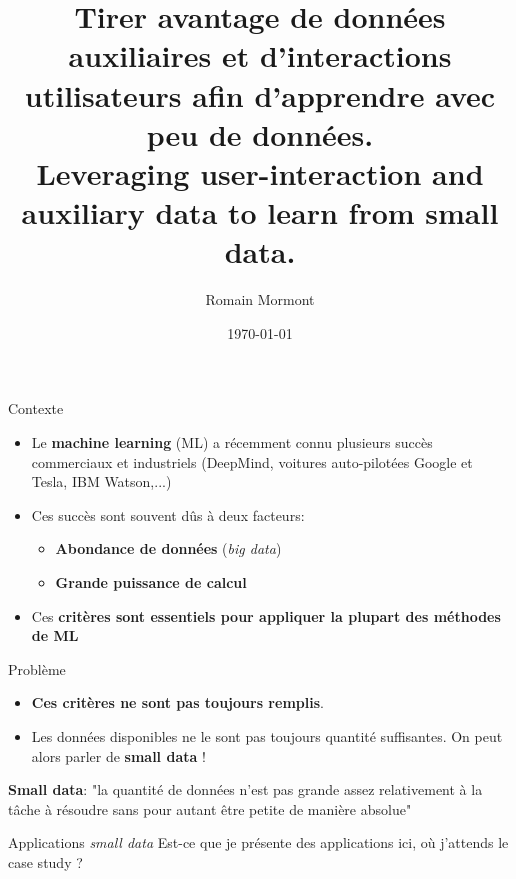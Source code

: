 \documentclass{beamer}
\title{
{\bf Tirer avantage de données auxiliaires et d'interactions utilisateurs afin d'apprendre avec peu de données.} \\
{\footnotesize \bf Leveraging user-interaction and auxiliary data to learn from small data.}
}
\author{Romain Mormont}
\institute{Unité systèmes et modélisation, \\ Département d'électricité, électronique et informatique, \\ Université de Liège, Belgique}
\date{\today}
\begin{document}


\begin{frame}
\titlepage
\end{frame}

\begin{frame}{Contexte}
	\begin{itemize}
		\item Le \textbf{machine learning} (ML) a récemment connu plusieurs succès commerciaux et industriels (DeepMind, voitures auto-pilotées Google et Tesla, IBM Watson,...)
		\item Ces succès sont souvent dûs à deux facteurs: 
		\begin{itemize}
			\item \textbf{Abondance de données} (\textit{big data})
			\item \textbf{Grande puissance de calcul}
		\end{itemize}
		\item Ces \textbf{critères sont essentiels pour appliquer la plupart des méthodes de ML} 
	\end{itemize}
\end{frame}

\begin{frame}{Problème}
	\begin{itemize}
		\item \textbf{Ces critères ne sont pas toujours remplis}.
		\item Les données disponibles ne le sont pas toujours quantité suffisantes. On peut alors parler de \textbf{small data} !
	\end{itemize}
	\vspace{1cm}
	\begin{center}
		\large
		\textbf{Small data}: "la quantité de données n'est pas grande assez relativement à la tâche à résoudre sans pour autant être petite de manière absolue" 
	\end{center}
\end{frame}

\begin{frame}{Applications \textit{small data}}
	Est-ce que je présente des applications ici, où j'attends le case study ? 
\end{frame}
\end{document}
